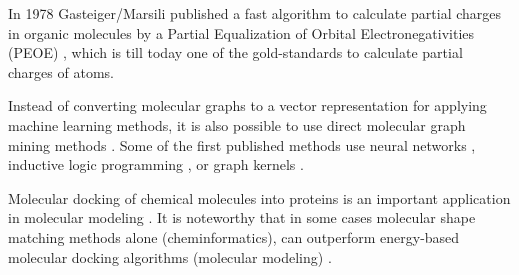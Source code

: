 \documentclass{sig-alternate}
\begin{document}
In 1978 Gasteiger/Marsili published a fast algorithm to calculate
partial charges in organic molecules by a Partial Equalization of
Orbital Electronegativities (PEOE) \cite{gm78}, which is till today
one of the gold-standards to calculate partial charges of atoms.

Instead of converting molecular graphs to a vector representation for
applying machine learning methods, it is also possible to use direct
molecular graph mining methods \cite{okada2006}. Some of the first
published methods use neural networks \cite{kireev1995}, inductive
logic programming \cite{yh02a}, or graph kernels \cite{kti03}.

Molecular docking of chemical molecules into proteins is an important
application in molecular modeling \cite{Leach2001}. It is noteworthy
that in some cases molecular shape matching methods alone
(cheminformatics), can outperform energy-based molecular docking
algorithms (molecular modeling) \cite{hsn07}.



\end{document}
